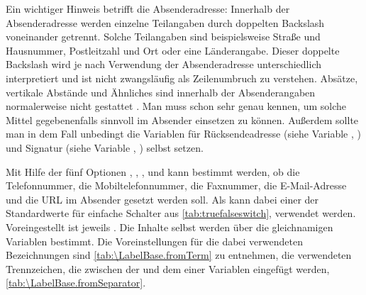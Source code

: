 Ein wichtiger Hinweis betrifft  die
Absenderadresse: Innerhalb der Absenderadresse werden einzelne Teilangaben
durch doppelten Backslash voneinander getrennt. Solche Teilangaben sind
beispielsweise Straße und Hausnummer, Postleitzahl und Ort oder eine
Länderangabe. Dieser doppelte Backslash wird je nach Verwendung der
Absenderadresse unterschiedlich interpretiert und ist nicht zwangsläufig als
Zeilenumbruch zu verstehen.  Absätze, vertikale Abstände und Ähnliches sind
innerhalb der Absenderangaben normalerweise nicht gestattet%
\iftrue %
. Man muss \KOMAScript{} schon sehr genau kennen, um solche Mittel
gegebenenfalls sinnvoll im Absender einsetzen zu können.  Außerdem sollte man
in dem Fall unbedingt die Variablen für Rücksendeadresse (siehe Variable
,
) und Signatur (siehe Variable
,
) selbst setzen.%
\else %
\ und hätten außerdem gegebenenfalls Auswirkungen auf die Rücksendeadresse
(siehe Variable \DescRef{\LabelBase.variable.backaddress},
\DescPageRef{\LabelBase.variable.backaddress}) und Signatur (siehe Variable
\DescRef{\LabelBase.variable.signature},
\DescPageRef{\LabelBase.variable.signature}).%
\fi %
%
\EndIndexGroup


\begin{Declaration}
\end{Declaration}%
Mit Hilfe der fünf Optionen ,
, ,
 und  kann bestimmt werden, ob die
Telefonnummer, die
Mobiltelefonnummer, die Faxnummer,
die E-Mail-Adresse und die URL im Absender gesetzt werden
soll. Als  kann dabei einer der Standardwerte für einfache
Schalter aus \autoref{tab:truefalseswitch}, 
verwendet werden. Voreingestellt ist jeweils
. Die Inhalte selbst werden über die gleichnamigen Variablen
bestimmt. Die Voreinstellungen für die dabei verwendeten Bezeichnungen sind
\autoref{tab:\LabelBase.fromTerm} zu entnehmen, die verwendeten Trennzeichen,
die zwischen der  und dem  einer Variablen
eingefügt werden, \autoref{tab:\LabelBase.fromSeparator}.

